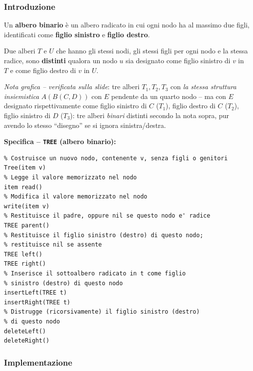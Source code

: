 \documentclass[12pt, a4paper]{article}
\begin{document}
\subsubsection{Introduzione}

\begin{tcolorbox}[colback=lightergray!10, colframe=tocsec, title=\textbf{Definizione: Albero Binario}]
\label{def:albero-binario}
Un \textbf{albero binario} è un albero radicato in cui ogni nodo ha al massimo due figli, identificati come \textbf{figlio sinistro} e \textbf{figlio destro}.
\end{tcolorbox}

\begin{tcolorbox}[colback=lightergray!5, colframe=tocsubsec, title=\textbf{Nota}]
Due alberi $T$ e $U$ che hanno gli stessi nodi, gli stessi figli per ogni nodo e la stessa radice, sono \textbf{distinti} qualora un nodo $u$ sia designato come figlio sinistro di $v$ in $T$ e come figlio destro di $v$ in $U$.
\end{tcolorbox}

\textit{Nota grafica -- verificata sulla slide}: tre alberi $T_1,T_2,T_3$ con \emph{la stessa struttura insiemistica} $A(B(C,D))$ con $E$ pendente da un quarto nodo -- ma con $E$ designato rispettivamente come figlio sinistro di $C$ ($T_1$), figlio destro di $C$ ($T_2$), figlio sinistro di $D$ ($T_3$): tre alberi \emph{binari} distinti secondo la nota sopra, pur avendo lo stesso ``disegno'' se si ignora sinistra/destra.

\textbf{Specifica -- \texttt{TREE} (albero binario):}
\begin{verbatim}
% Costruisce un nuovo nodo, contenente v, senza figli o genitori
Tree(item v)
% Legge il valore memorizzato nel nodo
item read()
% Modifica il valore memorizzato nel nodo
write(item v)
% Restituisce il padre, oppure nil se questo nodo e' radice
TREE parent()
% Restituisce il figlio sinistro (destro) di questo nodo;
% restituisce nil se assente
TREE left()
TREE right()
% Inserisce il sottoalbero radicato in t come figlio
% sinistro (destro) di questo nodo
insertLeft(TREE t)
insertRight(TREE t)
% Distrugge (ricorsivamente) il figlio sinistro (destro)
% di questo nodo
deleteLeft()
deleteRight()
\end{verbatim}

\subsubsection{Implementazione}
\end{document}
